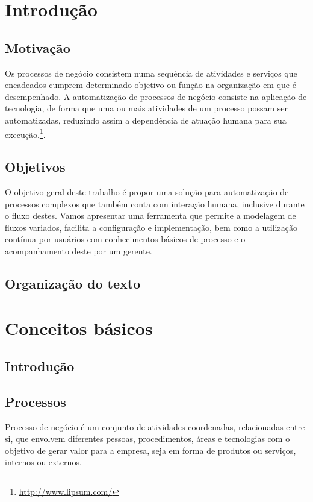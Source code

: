 \chapter{Introdução}\label{chp:LABEL_CHP_1}

\section{Motivação}\label{sec:LABEL_CHP_1_SEC_A}
Os processos de negócio consistem numa sequência de atividades e serviços que  encadeados cumprem determinado objetivo ou função na organização em que é desempenhado. A automatização de processos de negócio consiste na aplicação de tecnologia, de forma que uma ou mais atividades de um processo possam ser automatizadas, reduzindo assim a dependência de atuação humana para sua execução.\footnote{\url{http://www.lipsum.com/}}.

\section{Objetivos}\label{sec:LABEL_CHP_1_SEC_B}
O objetivo geral deste trabalho é propor uma solução para automatização de processos complexos que também conta com interação humana, inclusive durante o fluxo destes. Vamos apresentar uma ferramenta que permite a modelagem de fluxos variados, facilita a configuração e implementação, bem como a utilização contínua por usuários com conhecimentos básicos de processo e o acompanhamento deste por um gerente.

\section{Organização do texto}\label{sec:LABEL_CHP_1_SEC_C}

\chapter{Conceitos básicos}\label{chp:LABEL_CHP_2}

\section{Introdução}\label{sec:LABEL_CHP_2_SEC_A}

\section{Processos}\label{sec:LABEL_CHP_2_SEC_B}
Processo de negócio é um conjunto de atividades coordenadas, relacionadas entre si, que envolvem diferentes pessoas, procedimentos, áreas e tecnologias com o objetivo de gerar valor para a empresa, seja em forma de produtos ou serviços, internos ou externos.

